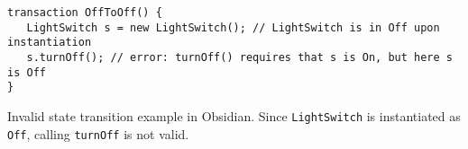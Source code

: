 \begin{listing}
    \centering
    \begin{verbatim}
transaction OffToOff() {
   LightSwitch s = new LightSwitch(); // LightSwitch is in Off upon instantiation
   s.turnOff(); // error: turnOff() requires that s is On, but here s is Off
}
    \end{verbatim}
    \caption{Invalid state transition example in Obsidian. Since \texttt{LightSwitch} is instantiated as \texttt{Off}, calling \texttt{turnOff} is not valid.}
    \label{lst:obsidian-transaction-err}
\end{listing}

